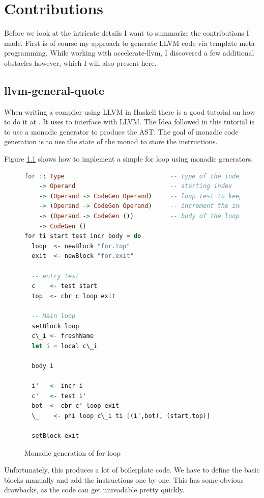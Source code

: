 \documentclass[a4paper,bibliography=totocnumbered,parskip,headsepline]{scrbook}
\begin{document}
\chapter{Contributions}
Before we look at the intricate details I want to summarize the contributions I made.
First is of course my approach to generate LLVM code via template meta programming.
While working with accelerate-llvm, I discovered a few additional obstacles however, which I will also present here.

\section{llvm-general-quote}
When writing a compiler using LLVM in Haskell there is a good tutorial on how to do it at .
It uses  to interface with LLVM.
The Idea followed in this tutorial is to use a monadic generator to produce the AST.
The goal of monadic code generation is to use the state of the monad to store the instructions.

Figure \ref{fig:formonad} shows how to implement a simple for loop using monadic generators.
\begin{figure}
\begin{lstlisting}[language=haskell]
for :: Type                             -- type of the index
    -> Operand                          -- starting index
    -> (Operand -> CodeGen Operand)     -- loop test to keep going
    -> (Operand -> CodeGen Operand)     -- increment the index
    -> (Operand -> CodeGen ())          -- body of the loop
    -> CodeGen ()
for ti start test incr body = do
  loop  <- newBlock "for.top"
  exit  <- newBlock "for.exit"

  -- entry test
  c    <- test start
  top  <- cbr c loop exit

  -- Main loop
  setBlock loop
  c\_i <- freshName
  let i = local c\_i

  body i

  i'   <- incr i
  c'   <- test i'
  bot  <- cbr c' loop exit
  \_    <- phi loop c\_i ti [(i',bot), (start,top)]

  setBlock exit
\end{lstlisting}
\caption{Monadic generation of for loop}
\label{fig:formonad}
\end{figure}

Unfortunately, this produces a lot of boilerplate code.
We have to define the basic blocks manually and add the instructions one by one.
This has some obvious drawbacks, as the code can get unreadable pretty quickly.
\end{document}
